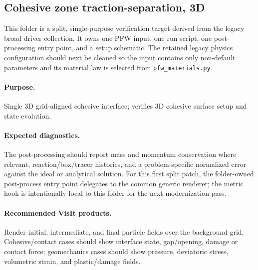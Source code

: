 \subsection{Cohesive zone traction-separation, 3D}
\label{sec:cohesiveZoneTraction3D}

This folder is a split, single-purpose verification target derived from the
legacy broad driver collection.  It owns one PFW input, one run script, one
post-processing entry point, and a setup schematic.  The retained legacy physics
configuration should next be cleaned so the input contains only non-default
parameters and its material law is selected from \texttt{pfw\_materials.py}.

\paragraph{Purpose.} Single 3D grid-aligned cohesive interface; verifies 3D cohesive surface setup and state evolution.

\paragraph{Expected diagnostics.} The post-processing should report mass and
momentum conservation where relevant, reaction/box/tracer histories, and a
problem-specific normalized error against the ideal or analytical solution.  For
this first split patch, the folder-owned post-process entry point delegates to
the common generic renderer; the metric hook is intentionally local to this
folder for the next modernization pass.

\paragraph{Recommended VisIt products.} Render initial, intermediate, and final
particle fields over the background grid.  Cohesive/contact cases should show
interface state, gap/opening, damage or contact force; geomechanics cases should
show pressure, deviatoric stress, volumetric strain, and plastic/damage fields.
